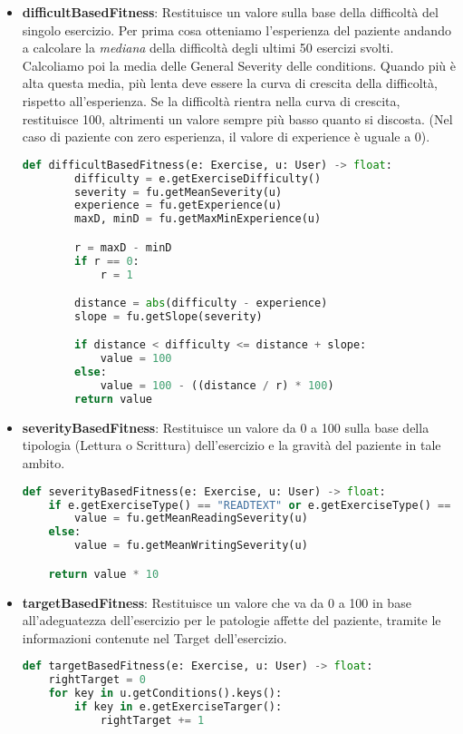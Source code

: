 \documentclass{article}
\begin{document}
\begin{itemize}

\item\textbf{difficultBasedFitness}: Restituisce un valore sulla base della difficoltà del singolo esercizio. Per prima cosa otteniamo l'esperienza del paziente andando a calcolare la \textit{mediana} della difficoltà degli ultimi 50 esercizi svolti. Calcoliamo poi la media delle General Severity delle conditions. Quando più è alta questa media, più lenta deve essere la curva di crescita della difficoltà, rispetto all'esperienza. Se la difficoltà rientra nella curva di crescita, restituisce 100, altrimenti un valore sempre più basso quanto si discosta. (Nel caso di paziente con zero esperienza, il valore di experience è uguale a 0).
\begin{lstlisting}[language = Python]
    def difficultBasedFitness(e: Exercise, u: User) -> float:
        difficulty = e.getExerciseDifficulty()
        severity = fu.getMeanSeverity(u)
        experience = fu.getExperience(u)
        maxD, minD = fu.getMaxMinExperience(u)

        r = maxD - minD
        if r == 0:
            r = 1

        distance = abs(difficulty - experience)
        slope = fu.getSlope(severity)

        if distance < difficulty <= distance + slope:
            value = 100
        else:
            value = 100 - ((distance / r) * 100)
        return value
\end{lstlisting}


\item\textbf{severityBasedFitness}: Restituisce un valore da 0 a 100 sulla base della tipologia (Lettura o Scrittura) dell'esercizio e la gravità del paziente in tale ambito.
\begin{lstlisting}[language = Python]
    def severityBasedFitness(e: Exercise, u: User) -> float:
    if e.getExerciseType() == "READTEXT" or e.getExerciseType() == "TEXTTOIMAGES" or e.getExerciseType() == "READIMAGES":
        value = fu.getMeanReadingSeverity(u)
    else:
        value = fu.getMeanWritingSeverity(u)

    return value * 10
\end{lstlisting}



\item\textbf{targetBasedFitness}: Restituisce un valore che va da 0 a 100 in base all'adeguatezza dell'esercizio per le patologie affette del paziente, tramite le informazioni contenute nel Target dell'esercizio.
\begin{lstlisting}[language = Python]
    def targetBasedFitness(e: Exercise, u: User) -> float:
    rightTarget = 0
    for key in u.getConditions().keys():
        if key in e.getExerciseTarger():
            rightTarget += 1


\end{lstlisting}
\end{itemize}
\end{document}
